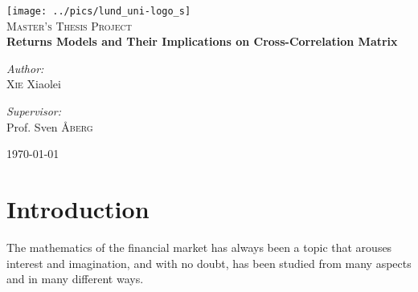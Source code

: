 \documentclass{report}
\author{Xie Xiaolei}
\date{\today}
\begin{document}
\begin{titlepage}
\begin{center}

\texttt{[image: ../pics/lund\_uni-logo\_s]}~\\[1cm]


\textsc{\Large Master's Thesis Project}\\[0.5cm]

{ \huge \bfseries Returns Models and Their Implications
  on Cross-Correlation Matrix \\[0.4cm] }


\begin{minipage}{0.4\textwidth}
\begin{flushleft} \large
\emph{Author:}\\
\textsc{Xie} Xiaolei
\end{flushleft}
\end{minipage}
\begin{minipage}{0.4\textwidth}
\begin{flushright} \large
\emph{Supervisor:} \\
Prof. Sven \textsc{\AA berg}
\end{flushright}
\end{minipage}

\vfill

{\large \today}

\end{center}
\end{titlepage}
\tableofcontents

\chapter{Introduction}
The mathematics of the financial market has always been a topic that
arouses interest and imagination, and with no doubt, has been
studied from many aspects and in many different ways.
\end{document}

